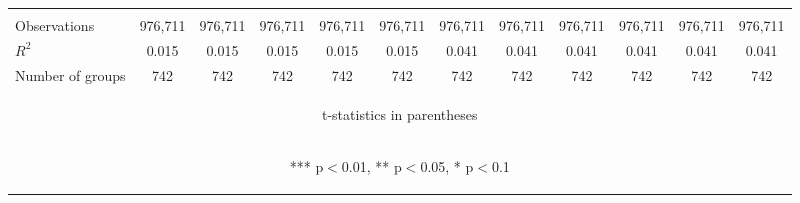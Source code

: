 \documentclass[]{article}
\begin{document}
\begin{center}
\begin{tabular}{lccccccccccc}
\vspace{4pt} & \begin{footnotesize}\end{footnotesize} & \begin{footnotesize}\end{footnotesize} & \begin{footnotesize}\end{footnotesize} & \begin{footnotesize}\end{footnotesize} & \begin{footnotesize}\end{footnotesize} & \begin{footnotesize}\end{footnotesize} & \begin{footnotesize}\end{footnotesize} & \begin{footnotesize}\end{footnotesize} & \begin{footnotesize}\end{footnotesize} & \begin{footnotesize}\end{footnotesize} & \begin{footnotesize}\end{footnotesize} \\
Observations & 976,711 & 976,711 & 976,711 & 976,711 & 976,711 & 976,711 & 976,711 & 976,711 & 976,711 & 976,711 & 976,711 \\
$R^2$ & 0.015 & 0.015 & 0.015 & 0.015 & 0.015 & 0.041 & 0.041 & 0.041 & 0.041 & 0.041 & 0.041 \\
 Number of groups & 742 & 742 & 742 & 742 & 742 & 742 & 742 & 742 & 742 & 742 & 742 \\ \hline
\multicolumn{12}{c}{\begin{footnotesize} t-statistics in parentheses\end{footnotesize}} \\
\multicolumn{12}{c}{\begin{footnotesize} *** p$<$0.01, ** p$<$0.05, * p$<$0.1\end{footnotesize}} \\
\end{tabular}
\end{center}
\end{document}
